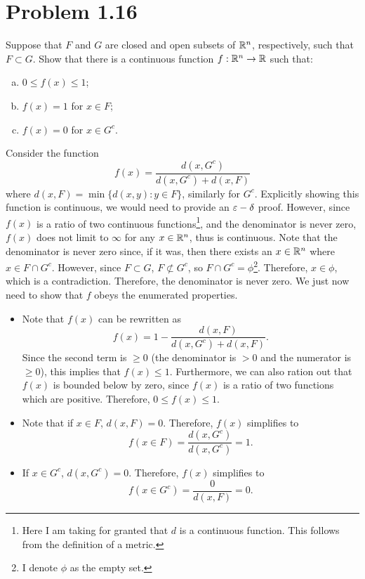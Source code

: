 \newpage
\section{Problem 1.16}
Suppose that $F$ and $G$ are closed and open subsets of $\mathbb{R}^n$, respectively, such that $F \subset G$. Show that there is a continuous function $f: \mathbb{R}^n \rightarrow \mathbb{R}$ such that:
\begin{enumerate}[(a)]
    \item $0 \leq f(x) \leq 1$;
    \item $f(x) = 1$ for $x \in F$;
    \item $f(x) = 0$ for $x \in G^c$.
\end{enumerate}
\partbreak
\begin{solution}

    Consider the function
    \[
    f(x) = \frac{d(x, G^c)}{d(x, G^c) + d(x, F)}
    \]
    where $d(x, F) = \min \{ d(x, y) : y \in F \}$, similarly for $G^c$. Explicitly showing this function is continuous, we would need to provide an $\varepsilon -\delta$ proof. However, since $f(x)$ is a ratio of two continuous functions\footnote{Here I am taking for granted that $d$ is a continuous function. This follows from the definition of a metric.}, and the denominator is never zero, $f(x)$ does not limit to $\infty$ for any $x \in \mathbb{R}^n$, thus is continuous. Note that the denominator is never zero since, if it was, then there exists an $x \in \mathbb{R}^n$ where $x \in F\cap G^c$. However, since $F \subset G$, $F \not\subset G^c$, so $F\cap G^c = \phi$\footnote{I denote $\phi$ as the empty set.}. Therefore, $x \in \phi$, which is a contradiction. Therefore, the denominator is never zero. We just now need to show that $f$ obeys the enumerated properties.

    \begin{itemize}[(a)]
        \item Note that $f(x)$ can be rewritten as
        \[
        f(x) = 1 - \frac{d(x, F)}{d(x, G^c) + d(x, F)}.
        \]
        Since the second term is $\geq 0$ (the denominator is $>0$ and the numerator is $\geq 0$), this implies that $f(x) \leq 1$. Furthermore, we can also ration out that $f(x)$ is bounded below by zero, since $f(x)$ is a ratio of two functions which are positive. Therefore, $0 \leq f(x) \leq 1$.
        \item Note that if $x \in F$, $d(x, F) = 0$. Therefore, $f(x)$ simplifies to 
        \[
        f(x \in F) = \frac{d(x, G^c)}{d(x, G^c)} = 1.
        \]
        \item If $x \in G^c$, $d(x, G^c) = 0$. Therefore, $f(x)$ simplifies to 
        \[
        f(x \in G^c) = \frac{0}{d(x, F)} = 0.
        \]
    \end{itemize}
\end{solution}
\newpage
